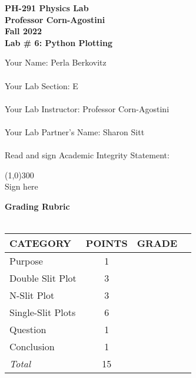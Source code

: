 

\begin{titlepage}

        \begin{center}
        \textbf{\huge PH-291 Physics Lab} \\ 
        \textbf{\Large Professor Corn-Agostini} \\ 
        \textbf{\Large Fall 2022} \\ 
        \vspace*{.5cm}  
        \textbf{\large Lab \# 6: Python Plotting}
        \vspace{0.5cm}
        \end{center}
       
\noindent Your Name: Perla Berkovitz\\ \\
\noindent Your Lab Section: E\\ \\
\noindent Your Lab Instructor: Professor Corn-Agostini\\ \\
\noindent Your Lab Partner's Name: Sharon Sitt\\ \\
\noindent Read and sign Academic Integrity Statement:\\


    \begin{center}
    \line(1,0){300} \\
    Sign here
    \end{center}

\noindent\textbf{\large Grading Rubric} \\ \\
\renewcommand{\arraystretch}{1.5}
\begin{tabular}{|l|c|r|l|} \hline
 {\bf CATEGORY \hspace{1cm}} & {\bf POINTS} & {\bf GRADE}\\\hline 
Purpose & 1 & \\\hline
Double Slit Plot & 3 & \\\hline
N-Slit Plot & 3 & \\\hline 
Single-Slit Plots & 6 & \\\hline 
Question & 1 & \\\hline 
Conclusion  & 1 & \\\hline \hline 
{\em Total} & 15 & \\ \hline
\end{tabular}

\end{titlepage} 



